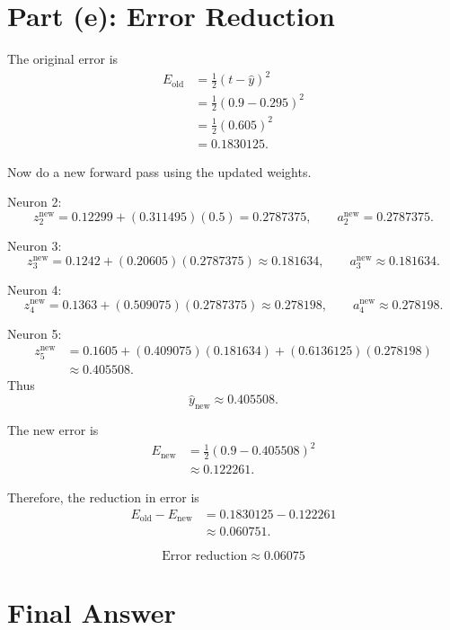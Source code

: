 \documentclass[11pt]{article}
\begin{document}
\section*{Part (e): Error Reduction}

The original error is
\[
\begin{aligned}
    E_{\text{old}}
    &=
    \frac12(t-\hat{y})^2 \\
    &=
    \frac12(0.9-0.295)^2 \\
    &=
    \frac12(0.605)^2 \\
    &=
    0.1830125.
\end{aligned}
\]

Now do a new forward pass using the updated weights.

Neuron 2:
\[
    z_2^{\text{new}}
    =
    0.12299+(0.311495)(0.5)
    =
    0.2787375,
    \qquad
    a_2^{\text{new}}=0.2787375.
\]

Neuron 3:
\[
    z_3^{\text{new}}
    =
    0.1242+(0.20605)(0.2787375)
    \approx
    0.181634,
    \qquad
    a_3^{\text{new}}\approx 0.181634.
\]

Neuron 4:
\[
    z_4^{\text{new}}
    =
    0.1363+(0.509075)(0.2787375)
    \approx
    0.278198,
    \qquad
    a_4^{\text{new}}\approx 0.278198.
\]

Neuron 5:
\[
\begin{aligned}
    z_5^{\text{new}}
    &=
    0.1605+(0.409075)(0.181634)+(0.6136125)(0.278198) \\
    &\approx
    0.405508.
\end{aligned}
\]
Thus
\[
    \hat{y}_{\text{new}}\approx 0.405508.
\]

The new error is
\[
\begin{aligned}
    E_{\text{new}}
    &=
    \frac12(0.9-0.405508)^2 \\
    &\approx
    0.122261.
\end{aligned}
\]

Therefore, the reduction in error is
\[
\begin{aligned}
    E_{\text{old}}-E_{\text{new}}
    &=
    0.1830125-0.122261 \\
    &\approx
    0.060751.
\end{aligned}
\]

\[
    \boxed{\text{Error reduction}\approx 0.06075}
\]

\section*{Final Answer}
\end{document}
